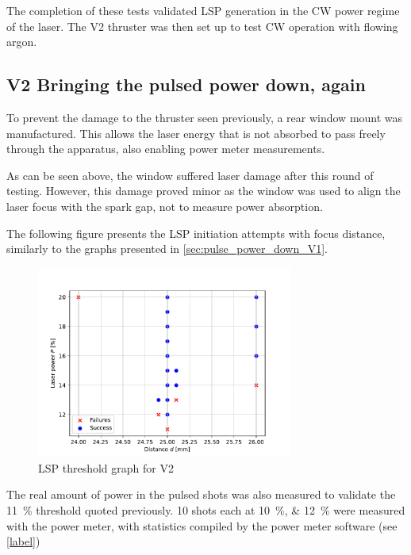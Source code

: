 
        The completion of these tests validated LSP generation in the CW power regime of the laser. The V2 thruster was then set up to test CW operation with flowing argon.

    \subsection{V2 Bringing the pulsed power down, again}

        To prevent the damage to the thruster seen previously, a rear window mount was manufactured. This allows the laser energy that is not absorbed to pass freely through the apparatus, also enabling power meter measurements. 
        

        As can be seen above, the window suffered laser damage after this round of testing. However, this damage proved minor as the window was used to align the laser focus with the spark gap, not to measure power absorption.
        
        The following figure presents the LSP initiation attempts with focus distance, similarly to the graphs presented in \autoref{sec:pulse_power_down_V1}.

        \begin{figure}[!ht]
            \centering
            \includegraphics[width=0.75\textwidth]{assets/4 experiments/V2_focus_threshold.pdf}
            \caption{LSP threshold graph for V2}
        \end{figure}

        The real amount of power in the pulsed shots was also measured to validate the \qty{11}{\%} threshold quoted previously. 10 shots each at \qtylist{10; 12}{\%} were measured with the power meter, with statistics compiled by the power meter software (see \autoref{label})

